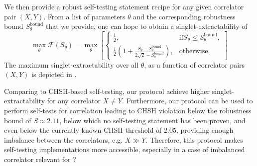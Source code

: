 We then provide a robust self-testing statement recipe for any given correlator pair $(X,Y)$.
From a list of parameters $\theta$ and the corresponding robustness bound $S_\theta^\text{bound}$ that we provide, one can hope to obtain a singlet-extractability of 
\begin{equation}
	\max_\theta \mathcal{F}(S_\theta) = \max_\theta \left[ \begin{cases}
			\frac{1}{2},& \text{if} S_\theta \leq S_\theta^\text{bound}, \\
			\frac{1}{2}\left(1+\frac{S_\theta - S_\theta^\text{bound}}{2\sqrt{2}-S_\theta^\text{bound}}\right), & \text{otherwise}.
	\end{cases} \right]
	\label{eq:singlet-extractability-theta}
\end{equation}
The maximum singlet-extractability over all $\theta$, as a function of correlator pairs $(X,Y)$ is depicted in .

Comparing to CHSH-based self-testing, our protocol achieve higher singlet-extractability for any correlator $X\neq Y$.
Furthermore, our protocol can be used to perform self-tests for correlation leading to CHSH violation below the robustness bound of $S\approx 2.11$, below which no self-testing statement has been proven, and even below the currently known CHSH threshold of $2.05$, providing enough imbalance between the correlators, e.g. $X \gg Y$.
Therefore, this protocol makes self-testing implementations more accessible, especially in a case of imbalanced correlator relevant for ?

